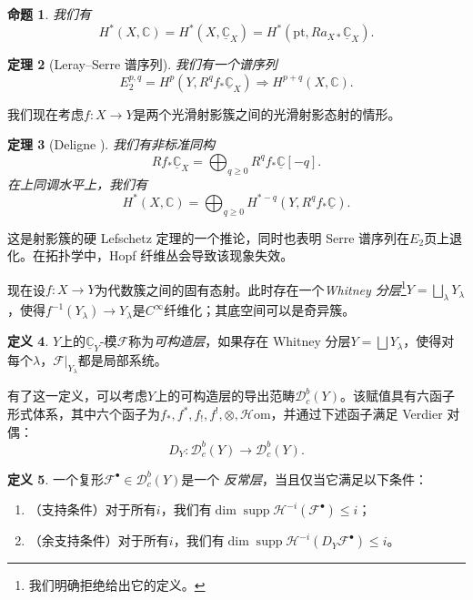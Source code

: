 \documentclass{amsart}
\newtheorem{thm}{定理}[section]
\newtheorem{prop}[thm]{命题}
\theoremstyle{definition}
\newtheorem{defn}[thm]{定义}
\theoremstyle{remark}
\theoremstyle{plain}
\theoremstyle{definition}
\theoremstyle{remark}
\newcommand{\C}{\mathbb{C}}
\newcommand{\mc}[1]{\mathcal{#1}}
\newcommand{\mr}[1]{\mathrm{#1}}
\newcommand{\on}[1]{\operatorname{#1}}
\newcommand{\ul}[1]{\underline{#1}}
\newcommand{\1}{\mathbf{1}}
\newcommand{\2}{\mathbf{2}}
\newcommand{\3}{\mathbf{3}}
\begin{document}
\begin{prop}
我们有
    \[ H^*(X, \C) = H^*(X, \ul{\C}_X) = H^*(\mr{pt}, R a_{X*} \ul{\C}_X). \]
\end{prop}

\begin{thm}[Leray--Serre 谱序列]
我们有一个谱序列
    \[ E_2^{p,q} = H^p(Y, R^q f_* \ul{\C}_X) \Rightarrow H^{p+q}(X, \C). \]
\end{thm}

我们现在考虑\(f \colon X \to Y\)是两个光滑射影簇之间的光滑射影态射的情形。

\begin{thm}[Deligne {\cite{Deligne1968}}]
我们有非标准同构
    \[ R f_* \ul{\C}_X = \bigoplus_{q \geq 0} R^q f_* \ul{\C}[-q]. \]
在上同调水平上，我们有
    \[ H^*(X, \C) = \bigoplus_{q \geq 0} H^{*-q}(Y, R^q f_* \ul{\C}). \]
\end{thm}

这是射影簇的硬 Lefschetz 定理的一个推论，同时也表明 Serre 谱序列在\(E_2\)页上退化。在拓扑学中，Hopf 纤维丛会导致该现象失效。

现在设\(f \colon X \to Y\)为代数簇之间的固有态射。此时存在一个\textit{Whitney 分层}\footnote{我们明确拒绝给出它的定义。}\(Y = \bigsqcup_{\lambda} Y_{\lambda}\)，使得\(f^{-1}(Y_{\lambda}) \to Y_{\lambda}\)是\(C^{\infty}\)纤维化；其底空间可以是奇异簇。

\begin{defn}
    \(Y\)上的\(\ul{\C}_Y\)-模\(\mc{F}\)称为\textit{可构造层}，如果存在 Whitney 分层\(Y = \bigsqcup Y_{\lambda}\)，使得对每个\(\lambda\)，\(\mc{F}|_{Y_{\lambda}}\)都是局部系统。
\end{defn}

有了这一定义，可以考虑\(Y\)上的可构造层的导出范畴\(\mc{D}_c^b(Y)\)。该赋值具有六函子形式体系，其中六个函子为\(f_*, f^*, f_!, f^!, \otimes, \mc{H}\mr{om}\)，并通过下述函子满足 Verdier 对偶：
\[ D_Y \colon \mc{D}_c^b(Y) \to \mc{D}_c^b(Y). \]

\begin{defn}
    一个复形\(\mc{F}^{\bullet} \in \mc{D}_c^b(Y)\)是一个 \textit{反常层}，当且仅当它满足以下条件：
    \begin{enumerate}
        \item（支持条件）对于所有\(i\)，我们有\(\dim \on{supp} \mc{H}^{-i}(\mc{F}^{\bullet}) \leq i\)；
        \item（余支持条件）对于所有\(i\)，我们有\(\dim \on{supp} \mc{H}^{-i}(D_Y \mc{F}^{\bullet}) \leq i\)。
    \end{enumerate}
\end{defn}
\end{document}
